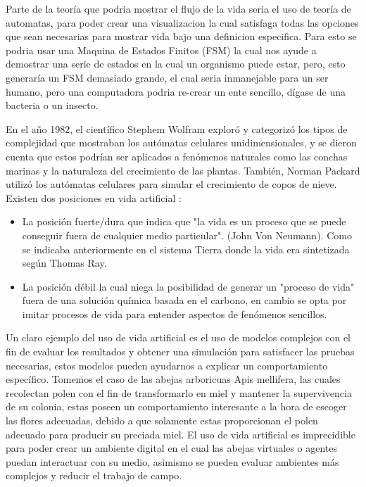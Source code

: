 \documentclass[conference]{IEEEtran}
\begin{document}
Parte de la teor\'ia que podria mostrar el flujo de la vida seria el uso de teor\'ia de automatas, para poder crear una visualizacion la cual satisfaga todas las opciones que sean necesarias para mostrar vida bajo una definicion especifica. Para esto se podria usar una Maquina de Estados Finitos (FSM) \cite{MARG01} la cual nos ayude a demostrar una serie de estados en la cual un organismo puede estar, pero, esto generar\'ia un FSM demasiado grande, el cual seria inmanejable para un ser humano, pero una computadora podria re-crear un ente sencillo, d\'igase de una bacteria o un insecto.  

En el a\~no 1982, el cient\'ifico Stephem Wolfram explor\'o y categoriz\'o los tipos de complejidad que mostraban los autómatas celulares unidimensionales, y se dieron cuenta que estos podr\'ian ser aplicados a fen\'omenos naturales como las conchas marinas y la naturaleza del crecimiento de las plantas. Tambi\'en, Norman Packard utiliz\'o los aut\'omatas celulares para simular el crecimiento de copos de nieve. \cite{VAD01} \\
Existen dos posiciones en vida artificial\cite{VAD01} :
\begin{itemize}
\item La posici\'on fuerte/dura que indica que "la vida es un proceso que se puede conseguir fuera de cualquier medio particular". (John Von Neumann). Como se indicaba anteriormente en el sistema Tierra donde la vida era sintetizada seg\'un Thomas Ray.
\item La posici\'on d\'ebil la cual niega la posibilidad de generar un "proceso de vida" fuera de una soluci\'on qu\'imica basada en el carbono, en cambio se opta por imitar procesos de vida para entender aspectos de fen\'omenos sencillos.
\end{itemize}


Un claro ejemplo del uso de vida artificial es el uso de modelos complejos con el fin de evaluar los resultados y obtener una simulaci\'on para satisfacer las pruebas necesarias, estos modelos pueden ayudarnos a explicar un comportamiento espec\'ifico. Tomemos el caso de las abejas arboricuas Apis mellifera, las cuales recolectan polen con el fin de transformarlo en miel y mantener la supervivencia de su colonia, estas poseen un comportamiento interesante a la hora de escoger las flores adecuadas, debido a que solamente estas proporcionan el polen adecuado para producir su preciada miel. \cite{ZOE01} El uso de vida artificial es imprecidible para poder crear un ambiente digital en el cual las abejas virtuales o agentes puedan interactuar con su medio, asimismo se pueden evaluar ambientes m\'as complejos y reducir el trabajo de campo. 
\end{document}
